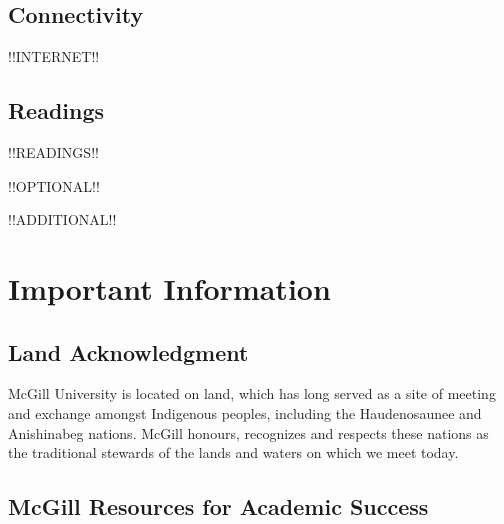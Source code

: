 \documentclass{article}
\begin{document}
\subsection{Connectivity}

!!INTERNET!!

\newpage

\subsection{Readings}

!!READINGS!!

!!OPTIONAL!!

!!ADDITIONAL!!

\newpage


\section{Important Information}

\subsection{Land Acknowledgment}

McGill University is located on land, which has long served as a site
of meeting and exchange amongst Indigenous peoples, including the
Haudenosaunee and Anishinabeg nations. McGill honours, recognizes and
respects these nations as the traditional stewards of the lands and
waters on which we meet today.

\subsection{McGill Resources for Academic Success}
\end{document}
